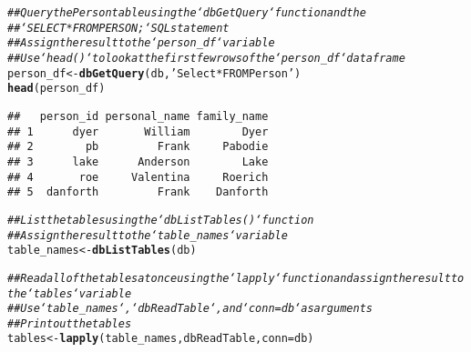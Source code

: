 \documentclass{article}\usepackage[]{graphicx}\usepackage[]{xcolor}
\makeatletter
\newcommand{\hlstr}[1]{\textcolor[rgb]{0.192,0.494,0.8}{#1}}%
\newcommand{\hlcom}[1]{\textcolor[rgb]{0.678,0.584,0.686}{\textit{#1}}}%
\newcommand{\hlstd}[1]{\textcolor[rgb]{0.345,0.345,0.345}{#1}}%
\newcommand{\hlkwb}[1]{\textcolor[rgb]{0.69,0.353,0.396}{#1}}%
\newcommand{\hlkwc}[1]{\textcolor[rgb]{0.333,0.667,0.333}{#1}}%
\newcommand{\hlkwd}[1]{\textcolor[rgb]{0.737,0.353,0.396}{\textbf{#1}}}%
\newenvironment{kframe}{%
 \def\at@end@of@kframe{}%
 \ifinner\ifhmode%
  \def\at@end@of@kframe{\end{minipage}}%
  \begin{minipage}{\columnwidth}%
 \fi\fi%
 \def\FrameCommand##1{\hskip\@totalleftmargin \hskip-\fboxsep
 \colorbox{shadecolor}{##1}\hskip-\fboxsep
     \hskip-\linewidth \hskip-\@totalleftmargin \hskip\columnwidth}%
 \MakeFramed {\advance\hsize-\width
   \@totalleftmargin\z@ \linewidth\hsize
   \@setminipage}}%
 {\par\unskip\endMakeFramed%
 \at@end@of@kframe}
\newenvironment{knitrout}{}{} %
\makeatother
\begin{document}
\begin{knitrout}
\begin{kframe}
\begin{alltt}
\hlcom{## Query the Person table using the `dbGetQuery` function and the}
\hlcom{## `SELECT * FROM PERSON;` SQL statement}
\hlcom{## Assign the result to the `person_df` variable}
\hlcom{## Use `head()` to look at the first few rows of the `person_df` dataframe}
\hlstd{person_df} \hlkwb{<-} \hlkwd{dbGetQuery}\hlstd{(db,} \hlstr{'Select * FROM Person'}\hlstd{)}
\hlkwd{head}\hlstd{(person_df)}
\end{alltt}
\begin{verbatim}
##   person_id personal_name family_name
## 1      dyer       William        Dyer
## 2        pb         Frank     Pabodie
## 3      lake      Anderson        Lake
## 4       roe     Valentina     Roerich
## 5  danforth         Frank    Danforth
\end{verbatim}
\begin{alltt}
\hlcom{## List the tables using the `dbListTables()` function}
\hlcom{## Assign the result to the `table_names` variable}
\hlstd{table_names} \hlkwb{<-} \hlkwd{dbListTables}\hlstd{(db)}

\hlcom{## Read all of the tables at once using the `lapply` function and assign the result to the `tables` variable}
\hlcom{## Use `table_names`, `dbReadTable`, and `conn = db` as arguments}
\hlcom{## Print out the tables}
\hlstd{tables} \hlkwb{<-} \hlkwd{lapply}\hlstd{(table_names, dbReadTable,} \hlkwc{conn} \hlstd{= db)}
\end{alltt}



\end{kframe}
\end{knitrout}
\end{document}
